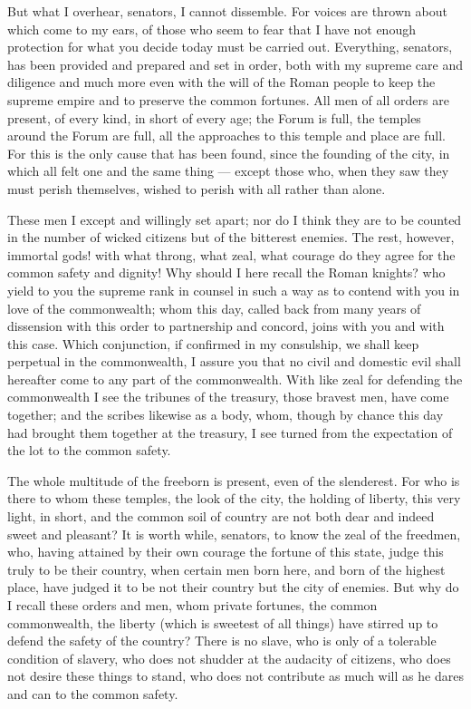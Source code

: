  But what I overhear, senators, I cannot dissemble. For voices are thrown about which come to my ears, of those who seem to fear that I have not enough protection for what you decide today must be carried out. Everything, senators, has been provided and prepared and set in order, both with my supreme care and diligence and much more even with the will of the Roman people to keep the supreme empire and to preserve the common fortunes. All men of all orders are present, of every kind, in short of every age; the Forum is full, the temples around the Forum are full, all the approaches to this temple and place are full. For this is the only cause that has been found, since the founding of the city, in which all felt one and the same thing --- except those who, when they saw they must perish themselves, wished to perish with all rather than alone.

 These men I except and willingly set apart; nor do I think they are to be counted in the number of wicked citizens but of the bitterest enemies. The rest, however, immortal gods! with what throng, what zeal, what courage do they agree for the common safety and dignity! Why should I here recall the Roman knights? who yield to you the supreme rank in counsel in such a way as to contend with you in love of the commonwealth; whom this day, called back from many years of dissension with this order to partnership and concord, joins with you and with this case. Which conjunction, if confirmed in my consulship, we shall keep perpetual in the commonwealth, I assure you that no civil and domestic evil shall hereafter come to any part of the commonwealth. With like zeal for defending the commonwealth I see the tribunes of the treasury, those bravest men, have come together; and the scribes likewise as a body, whom, though by chance this day had brought them together at the treasury, I see turned from the expectation of the lot to the common safety.

 The whole multitude of the freeborn is present, even of the slenderest. For who is there to whom these temples, the look of the city, the holding of liberty, this very light, in short, and the common soil of country are not both dear and indeed sweet and pleasant? It is worth while, senators, to know the zeal of the freedmen, who, having attained by their own courage the fortune of this state, judge this truly to be their country, when certain men born here, and born of the highest place, have judged it to be not their country but the city of enemies. But why do I recall these orders and men, whom private fortunes, the common commonwealth, the liberty (which is sweetest of all things) have stirred up to defend the safety of the country? There is no slave, who is only of a tolerable condition of slavery, who does not shudder at the audacity of citizens, who does not desire these things to stand, who does not contribute as much will as he dares and can to the common safety.

